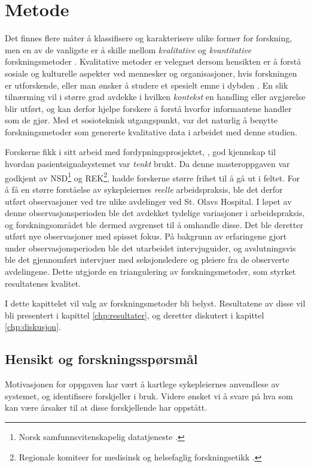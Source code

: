 \chapter{Metode}
\label{chp:metode} 

Det finnes flere måter å klassifisere og karakterisere ulike former for forskning, men en av de vanligste er å skille mellom \textit{kvalitative} og \textit{kvantitative} forskningsmetoder \citep{Myers13, Tjora}. Kvalitative metoder er velegnet dersom hensikten er å forstå sosiale og kulturelle aspekter ved mennesker og organisasjoner, hvis forskningen er utforskende, eller man ønsker å studere et spesielt emne i dybden \citep{Myers13}. En slik tilnærming vil i større grad avdekke i hvilken \textit{kontekst} en handling eller avgjørelse blir utført, og kan derfor hjelpe forskere å forstå hvorfor informantene handler som de gjør. Med et sosioteknisk utgangspunkt, var det naturlig å benytte forskningsmetoder som genererte kvalitative data i arbeidet med denne studien.

\noindent
Forskerne fikk i sitt arbeid med fordypningsprosjektet, \citet{Sund13}, god kjennskap til hvordan pasientsignalsystemet var \textit{tenkt} brukt. Da denne masteroppgaven var godkjent av NSD\footnote{Norsk samfunnsvitenskapelig datatjeneste \citep{NSD}.} og REK\footnote{Regionale komiteer for medisinsk og helsefaglig forskningsetikk \citep{REK}.}, hadde forskerne større frihet til å gå ut i feltet. For å få en større forståelse av sykepleiernes \textit{reelle} arbeidspraksis, ble det derfor utført observasjoner ved tre ulike avdelinger ved St. Olavs Hospital. I løpet av denne observasjonsperioden ble det avdekket tydelige variasjoner i arbeidspraksis, og forskningsområdet ble dermed avgrenset til å omhandle disse. Det ble deretter utført nye observasjoner med spisset fokus. På bakgrunn av erfaringene gjort under observasjonsperioden ble det utarbeidet intervjuguider, og avslutningsvis ble det gjennomført intervjuer med seksjonsledere og pleiere fra de observerte avdelingene. Dette utgjorde en triangulering av forskningsmetoder, som styrket resultatenes kvalitet.

\noindent
I dette kapittelet vil valg av forskningsmetoder bli belyst. Resultatene av disse vil bli presentert i kapittel \ref{chp:resultater}, og deretter diskutert i kapittel \ref{chp:diskusjon}. 


\section{Hensikt og forskningsspørsmål}
Motivasjonen for oppgaven har vært å kartlege sykepleiernes anvendlese av systemet, og identifisere forskjeller i bruk. Videre ønsket vi å svare på hva som kan være årsaker til at disse forskjellende har oppstått. 

